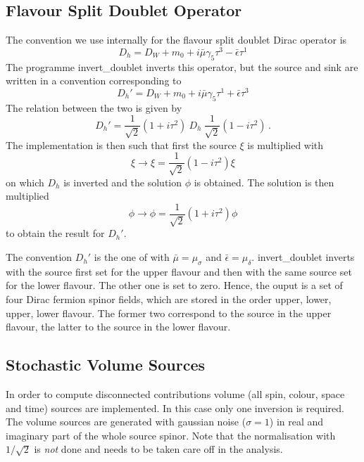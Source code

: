 \subsection{Flavour Split Doublet Operator}

The convention we use internally for the flavour split doublet Dirac
operator is 
\[
D_h = D_W + m_0 + i\bar\mu\gamma_5\tau^3 - \bar\epsilon\tau^1
\]
The programme {\ttfamily invert\_doublet} inverts this operator, but
the source and sink are written in a convention corresponding to
\[
D_h' = D_W + m_0 + i\bar\mu\gamma_5\tau^1 + \bar\epsilon\tau^3
\]
The relation between the two is given by
\[
D_h' = \frac{1}{\sqrt{2}}(1+i\tau^2)\ D_h\ \frac{1}{\sqrt{2}}(1-i\tau^2)\, .
\]
The implementation is then such that first the source $\xi$ is multiplied
with
\[
\xi\to\xi=\frac{1}{\sqrt{2}}(1-i\tau^2)\xi
\]
on which $D_h$ is inverted and the solution $\phi$ is obtained. The
solution is then multiplied
\[
\phi \to \phi=\frac{1}{\sqrt{2}}(1+i\tau^2)\phi
\]
to obtain the result for $D_h'$.

The convention $D_h'$ is the one of \cite{Chiarappa:2006ae} with
$\bar\mu = \mu_\sigma$ and $\bar\epsilon = \mu_\delta$. {\ttfamily
  invert\_doublet} inverts with the source first set for the upper
flavour and then with the same source set for the lower
flavour. The other one is set to zero. Hence, the ouput is a set of
four Dirac fermion spinor fields, which are stored in the order upper,
lower, upper, lower flavour. The former two correspond to the source
in the upper flavour, the latter to the source in the lower flavour.

\subsection{Stochastic Volume Sources}

In order to compute disconnected contributions volume (all spin,
colour, space and time) sources are implemented. In this case only one
inversion is required. The volume sources are generated with gaussian
noise ($\sigma=1$) in real and imaginary part of the whole source
spinor. Note that the normalisation with $1/\sqrt{2}$ is \emph{not}
done and needs to be taken care off in the analysis.

